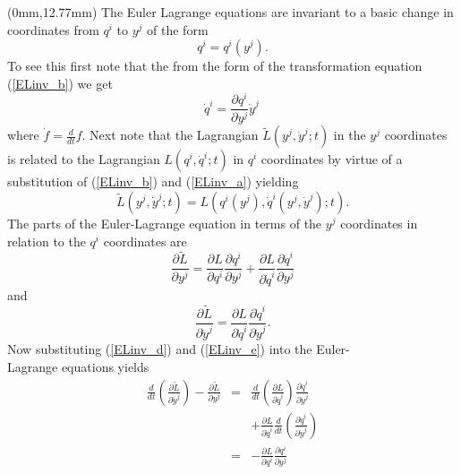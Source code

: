 \begin{textblock*}{75mm}(0mm,12.77mm)
The Euler Lagrange equations are invariant to a basic change in coordinates from $q^i$ to
$y^j$ of the form 
\begin{equation}\label{ELinv_b}
  q^i = q^i(y^j) .
\end{equation}
To see this first note that the from the 
form of the transformation equation (\ref{ELinv_b}) we get
\begin{equation}\label{ELinv_a}
  {\dot q}^i = \frac{\partial q^i}{\partial y^j} {\dot y}^j \,
\end{equation}
where $\dot f = \frac{d}{dt} f$. Next note that the Lagrangian 
$\tilde L (y^j,{\dot y}^j;t )$ in the $y^j$ coordinates 
is related to the Lagrangian $L (q^i,{\dot q}^i;t )$ 
in $q^i$ coordinates by virtue of a substitution of (\ref{ELinv_b}) 
and (\ref{ELinv_a}) yielding
\begin{equation}\label{ELinv_c}
  \tilde L (y^j,{\dot y}^j;t ) = L (q^i(y^j),{\dot q}^i(y^j,{\dot y}^j);t ) .
\end{equation}
The parts of the Euler-Lagrange equation in terms
of the $y^j$ coordinates in relation to the $q^i$ coordinates are
\begin{equation}\label{ELinv_d}
  \frac{\partial \tilde L}{\partial y^j} =    \frac{\partial L}{\partial q^i}        \frac{\partial q^i}{\partial y^j} 
                                        +  \frac{\partial L}{\partial {\dot q}^i} \frac{\partial {\dot q}^i}{\partial y^j}
\end{equation}
and
\begin{equation}\label{ELinv_e}
  \frac{\partial \tilde L}{\partial {\dot y}^j} = \frac{\partial L}{\partial {\dot q}^i} \frac{\partial {\dot q}^i}{\partial {\dot y}^j} .
\end{equation}
Now substituting (\ref{ELinv_d}) and (\ref{ELinv_e}) into the Euler-\\Lagrange equations
yields
\begin{eqnarray}\label{ELinv_f}
  \frac{d}{dt} \left( \frac{\partial \tilde L}{\partial {\dot y}^j } \right) - \frac{\partial \tilde L}{\partial y^j} 
    & = &   \frac{d}{d t} \left( \frac{\partial L}{\partial {\dot q}^i} \right) \frac{\partial {\dot q}^i}{\partial {\dot y}^j} \\ \nonumber
	&   & + \frac{\partial L}{\partial {\dot q}^i} \frac{d}{dt} \left( \frac{\partial {\dot q}^i}{\partial {\dot y}^j} \right) \\ \nonumber
    & = & - \frac{\partial L}{\partial q^i}        \frac{\partial q^i}{\partial y^j} 

\end{eqnarray}
\end{textblock*}
